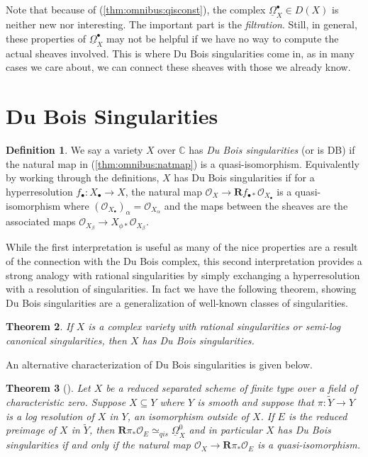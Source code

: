 \documentclass[proquest]{uwthesis}[2014/11/13]
\newtheorem{theorem}{Theorem}[section]
\theoremstyle{definition}
\newtheorem{definition}[theorem]{Definition}
\newcommand{\CC}{\mathbb{C}}
\newcommand{\OO}{\mathcal{O}}
\newcommand{\qis}{\simeq_{qis}}
\newcommand{\bR}{\textbf{R}}
\newcommand{\DB}{\underline{\Omega}}
\begin{document}
Note that because of (\ref{thm:omnibus:qisconst}), the complex $\DB_X^\bullet \in D(X)$ is neither new nor interesting.
The important part is the {\it filtration}.
Still, in general, these properties of $\DB_X^\bullet$ may not be helpful if we have no way to compute the actual sheaves involved.
This is where Du Bois singularities come in, as in many cases we care about, we can connect these sheaves with those we already know.

\section{Du Bois Singularities}

\begin{definition}
	\label{def:dubois}
	We say a variety $X$ over $\CC$ has {\it Du Bois singularities} (or is DB) if the natural map in (\ref{thm:omnibus:natmap}) is a quasi-isomorphism.
	Equivalently by working through the definitions, $X$  has Du Bois singularities if for a hyperresolution $f_{\bullet} : X_\bullet \rightarrow X$, the natural map $\OO_X \rightarrow\bR f_{\bullet *} \OO_{X_\bullet}$ is a quasi-isomorphism where $(\OO_{X_\bullet})_\alpha = \OO_{X_\alpha}$ and the maps between the sheaves are the associated maps $\OO_{X_\beta} \rightarrow X_{\phi *} \OO_{X_\beta}$.
\end{definition}

While the first interpretation is useful as many of the nice properties are a result of the connection with the Du Bois complex, this second interpretation provides a strong analogy with rational singularities by simply exchanging a hyperresolution with a resolution of singularities.
In fact we have the following theorem, showing Du Bois singularities are a generalization of well-known classes of singularities.
\begin{theorem}
	If $X$ is a complex variety with rational singularities or semi-log canonical singularities, then $X$ has Du Bois singularities.
\end{theorem}

An alternative characterization of Du Bois singularities is given below.

\begin{theorem}[\cite{Schwede2007}]
	Let $X$ be a reduced separated scheme of finite type over a field of characteristic zero.
	Suppose $X \subseteq Y$ where $Y$ is smooth and suppose that $\pi : \tilde{Y} \rightarrow Y$ is a log resolution of $X$ in $Y$, an isomorphism outside of $X$.
	If $E$ is the reduced preimage of $X$ in $\tilde{Y}$, then $\bR \pi_* \OO_E \qis \DB_X^0$ and in particular $X$ has Du Bois singularities if and only if the natural map $\OO_X \rightarrow \bR \pi_* \OO_E$ is a quasi-isomorphism.
\end{theorem}
\end{document}
